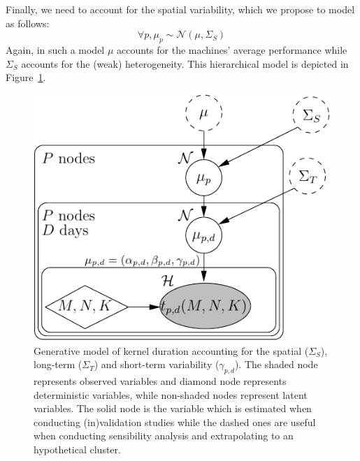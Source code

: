             Finally, we need to account for the spatial variability, which we propose to model as follows:
            \begin{equation}
                \label{eq:dgemm.spatial}
                \forall p, \mu_{p} \sim \mathcal{N}(\mu,\Sigma_S)
            \end{equation}
            Again, in such a model \(\mu\) accounts for the machines' average performance while \(\Sigma_S\) accounts
            for the (weak) heterogeneity. This hierarchical model is depicted in Figure~\ref{fig:model:generative}.
            \begin{figure}[htpb]
                \centering
                \includegraphics[width=0.6\linewidth]{img/prediction/modeling/kernels//generative_model.pdf}

                \caption{Generative model of kernel duration accounting for the
                  spatial ($\Sigma_S$), long-term ($\Sigma_T$) and short-term variability ($\gamma_{p,d}$). The shaded node
                  represents observed variables and diamond node represents
                  deterministic variables, while non-shaded nodes represent latent
                  variables. The solid node is the variable which is estimated
                  when conducting (in)validation studies while the dashed ones are
                  useful when conducting sensibility analysis and extrapolating to
                  an hypothetical cluster.}
                \label{fig:model:generative}
            \end{figure}

